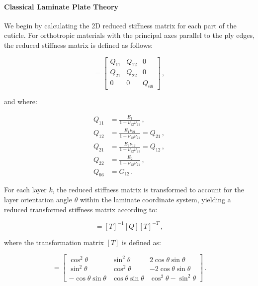 \documentclass[twocolumn, linenumbers, superscriptaddress, nofootinbib]{revtex4-1}
\begin{document}
			\paragraph*{Classical Laminate Plate Theory}
				We begin by calculating the 2D reduced stiffness matrix for each part of the cuticle.
				For orthotropic materials with the principal axes parallel to the ply edges, the reduced stiffness matrix is defined as follows:
				
				\begin{equation}
				[Q] =
					\begin{bmatrix}
						Q_{11} & Q_{12} & 0 \\
						Q_{21} & Q_{22} & 0 \\
						0 & 0 & Q_{66}
					\end{bmatrix}\,,
				\end{equation}
				
				and where:
				
				\begin{equation}
				\begin{aligned}
					Q_{11} & = \frac{E_{1}}{1 - \nu_{12}\nu_{21}}\,, \\
					Q_{12} & = \frac{E_{1}\nu_{21}}{1 - \nu_{12}\nu_{21}} = Q_{21}\,, \\
					Q_{21} & = \frac{E_{2}\nu_{12}}{1 - \nu_{12}\nu_{21}} = Q_{12}\,, \\
					Q_{22} & = \frac{E_{2}}{1 - \nu_{12}\nu_{21}}\,, \\
					Q_{66} & = G_{12}\,.
				\end{aligned}
				\end{equation}
				
				For each layer $k$, the reduced stiffness matrix is transformed to account for the layer orientation angle $\theta$ within the laminate coordinate system, yielding a reduced transformed stiffness matrix according to:
				
				\begin{equation}
					[\bar{Q}] = [T]^{-1}[Q][T]^{-T}\,,
				\end{equation}
				
				where the transformation matrix $[T]$ is defined as:
				
				\begin{equation}
				[T] =
				 \begin{bmatrix}
					 \cos^2\theta & \sin^2\theta & 2\cos\theta\sin\theta \\
					 \sin^2\theta & \cos^2\theta & -2\cos\theta\sin\theta \\
					 -\cos\theta\sin\theta & \cos\theta\sin\theta & \cos^2\theta - \sin^2\theta
				 \end{bmatrix}\,.
				\end{equation}
				
\end{document}
